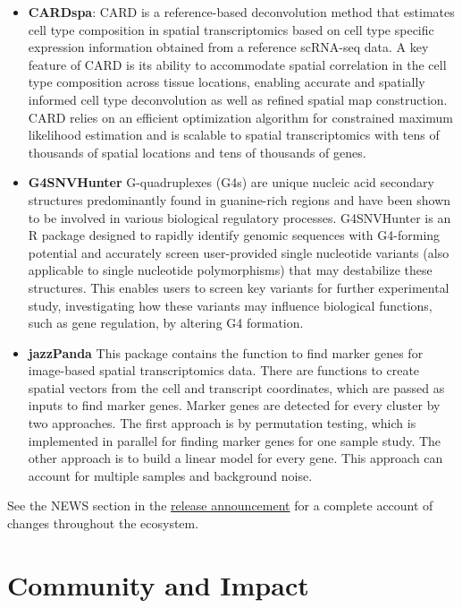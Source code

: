 \begin{itemize}
\item
  \textbf{CARDspa}: CARD is a reference-based deconvolution method that estimates cell type composition in spatial transcriptomics based on cell type specific expression information obtained from a reference scRNA-seq data. A key feature of CARD is its ability to accommodate spatial correlation in the cell type composition across tissue locations, enabling accurate and spatially informed cell type deconvolution as well as refined spatial map construction. CARD relies on an efficient optimization algorithm for constrained maximum likelihood estimation and is scalable to spatial transcriptomics with tens of thousands of spatial locations and tens of thousands of genes.
\item
  \textbf{G4SNVHunter} G-quadruplexes (G4s) are unique nucleic acid secondary structures predominantly found in guanine-rich regions and have been shown to be involved in various biological regulatory processes. G4SNVHunter is an R package designed to rapidly identify genomic sequences with G4-forming potential and accurately screen user-provided single nucleotide variants (also applicable to single nucleotide polymorphisms) that may destabilize these structures. This enables users to screen key variants for further experimental study, investigating how these variants may influence biological functions, such as gene regulation, by altering G4 formation.
\item
  \textbf{jazzPanda} This package contains the function to find marker genes for image-based spatial transcriptomics data. There are functions to create spatial vectors from the cell and transcript coordinates, which are passed as inputs to find marker genes. Marker genes are detected for every cluster by two approaches. The first approach is by permutation testing, which is implemented in parallel for finding marker genes for one sample study. The other approach is to build a linear model for every gene. This approach can account for multiple samples and background noise.
\end{itemize}

See the NEWS section in the \href{https://bioconductor.org/news/bioc_3_21_release/}{release announcement} for
a complete account of changes throughout the ecosystem.

\section{Community and Impact}\label{community-and-impact}

